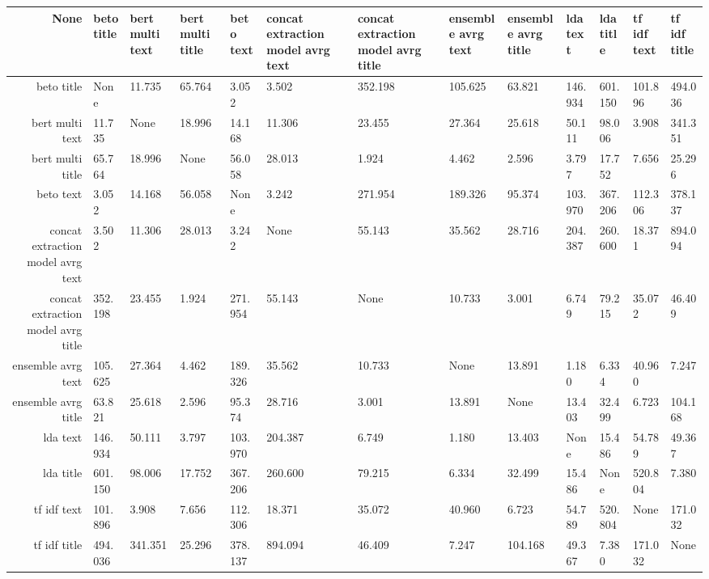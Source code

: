 \begin{tabular}{|r|l|l|l|l|l|l|l|l|l|l|l|l|}
  \hline
  None & beto title & bert multi text & bert multi title & beto text & concat extraction model avrg text & concat extraction model avrg title & ensemble avrg text & ensemble avrg title & lda text & lda title & tf idf text & tf idf title \\ 
  \hline
  beto title & None & 11.735 & 65.764 & 3.052 & 3.502 & 352.198 & 105.625 & 63.821 & 146.934 & 601.150 & 101.896 & 494.036 \\ 
  \hline
  bert multi text & 11.735 & None & 18.996 & 14.168 & 11.306 & 23.455 & 27.364 & 25.618 & 50.111 & 98.006 & 3.908 & 341.351 \\ 
  \hline
  bert multi title & 65.764 & 18.996 & None & 56.058 & 28.013 & 1.924 & 4.462 & 2.596 & 3.797 & 17.752 & 7.656 & 25.296 \\ 
  \hline
  beto text & 3.052 & 14.168 & 56.058 & None & 3.242 & 271.954 & 189.326 & 95.374 & 103.970 & 367.206 & 112.306 & 378.137 \\ 
  \hline
  concat extraction model avrg text & 3.502 & 11.306 & 28.013 & 3.242 & None & 55.143 & 35.562 & 28.716 & 204.387 & 260.600 & 18.371 & 894.094 \\ 
  \hline
  concat extraction model avrg title & 352.198 & 23.455 & 1.924 & 271.954 & 55.143 & None & 10.733 & 3.001 & 6.749 & 79.215 & 35.072 & 46.409 \\ 
  \hline
  ensemble avrg text & 105.625 & 27.364 & 4.462 & 189.326 & 35.562 & 10.733 & None & 13.891 & 1.180 & 6.334 & 40.960 & 7.247 \\ 
  \hline
  ensemble avrg title & 63.821 & 25.618 & 2.596 & 95.374 & 28.716 & 3.001 & 13.891 & None & 13.403 & 32.499 & 6.723 & 104.168 \\ 
  \hline
  lda text & 146.934 & 50.111 & 3.797 & 103.970 & 204.387 & 6.749 & 1.180 & 13.403 & None & 15.486 & 54.789 & 49.367 \\ 
  \hline
  lda title & 601.150 & 98.006 & 17.752 & 367.206 & 260.600 & 79.215 & 6.334 & 32.499 & 15.486 & None & 520.804 & 7.380 \\ 
  \hline
  tf idf text & 101.896 & 3.908 & 7.656 & 112.306 & 18.371 & 35.072 & 40.960 & 6.723 & 54.789 & 520.804 & None & 171.032 \\ 
  \hline
  tf idf title & 494.036 & 341.351 & 25.296 & 378.137 & 894.094 & 46.409 & 7.247 & 104.168 & 49.367 & 7.380 & 171.032 & None \\ 
  \hline
\end{tabular}
